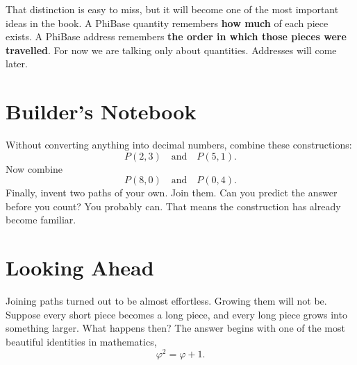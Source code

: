 That distinction is easy to miss, but it will become one of the most important ideas in the book. A PhiBase quantity remembers \textbf{how much} of each piece exists. A PhiBase address remembers \textbf{the order in which those pieces were travelled}. For now we are talking only about quantities. Addresses will come later.

\section*{Builder's Notebook}

Without converting anything into decimal numbers, combine these constructions:
\[
P(2,3) \quad \text{and} \quad P(5,1).
\]
Now combine
\[
P(8,0) \quad \text{and} \quad P(0,4).
\]
Finally, invent two paths of your own. Join them. Can you predict the answer before you count? You probably can. That means the construction has already become familiar.

\section*{Looking Ahead}

Joining paths turned out to be almost effortless. Growing them will not be. Suppose every short piece becomes a long piece, and every long piece grows into something larger. What happens then? The answer begins with one of the most beautiful identities in mathematics,
\[
\varphi^2=\varphi+1.
\]
